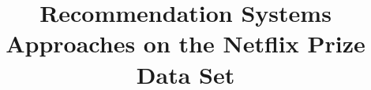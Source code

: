 \documentclass[conference,compsoc]{IEEEtran}
\begin{document}
\title{Recommendation Systems Approaches on the Netflix Prize Data Set}

\author{
	\and
}

\maketitle












\end{document}
